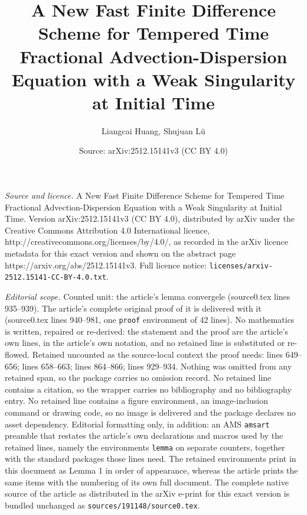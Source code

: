 \documentclass[10pt,a4paper]{amsart}
\title{A New Fast Finite Difference Scheme for Tempered Time Fractional Advection-Dispersion Equation with a Weak Singularity at Initial Time}
\author{Liangcai Huang, Shujuan L\"u}
\date{Source: arXiv:2512.15141v3 (CC BY 4.0)}
\begin{document}
\maketitle

\noindent\emph{Source and licence.} A New Fast Finite Difference Scheme for Tempered Time Fractional Advection-Dispersion Equation with a Weak Singularity at Initial Time. Version arXiv:2512.15141v3 (CC BY 4.0), distributed by arXiv under the Creative Commons Attribution 4.0 International licence, http://creativecommons.org/licenses/by/4.0/, as recorded in the arXiv licence metadata for this exact version and shown on the abstract page https://arxiv.org/abs/2512.15141v3. Full licence notice: \texttt{licenses/arxiv-2512.15141-CC-BY-4.0.txt}.\par\smallskip

\noindent\textit{Editorial scope.} Counted unit: the article's lemma convergele (source0.tex lines 935--939). The article's complete original proof of it is delivered with it (source0.tex lines 940--981, one \texttt{proof} environment of 42 lines). No mathematics is written, repaired or re-derived: the statement and the proof are the article's own lines, in the article's own notation, and no retained line is substituted or re-flowed.  Retained uncounted as the source-local context the proof needs: lines 649--656; lines 658--663; lines 864--866; lines 929--934.  Nothing was omitted from any retained span, so the package carries no omission record.  No retained line contains a citation, so the wrapper carries no bibliography and no bibliography entry.  No retained line contains a figure environment, an image-inclusion command or drawing code, so no image is delivered and the package declares no asset dependency.  Editorial formatting only, in addition: an AMS \texttt{amsart} preamble that restates the article's own declarations and macros used by the retained lines, namely the environments \texttt{lemma} on separate counters, together with the standard packages those lines need.  The retained environments print in this document as Lemma 1 in order of appearance, whereas the article prints the same items with the numbering of its own full document.  The complete native source of the article as distributed in the arXiv e-print for this exact version is bundled unchanged as \texttt{sources/191148/source0.tex}.
\end{document}
